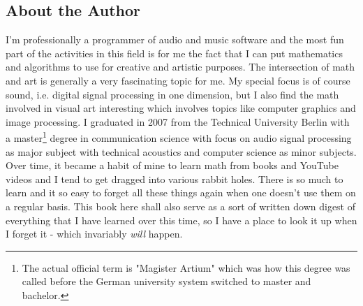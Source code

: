 

\subsection{About the Author}
I'm professionally a programmer of audio and music software and the most fun part of the activities in this field is for me the fact that I can put mathematics and algorithms to use for creative and artistic purposes. The intersection of math and art is generally a very fascinating topic for me. My special focus is of course sound, i.e. digital signal processing in one dimension, but I also find the math involved in visual art interesting which involves topics like computer graphics and image processing. I graduated in 2007 from the Technical University Berlin with a master\footnote{The actual official term is "Magister Artium" which was how this degree was called before the German university system switched to master and bachelor.} degree in communication science with focus on audio signal processing as major subject with technical acoustics and computer science as minor subjects. Over time, it became a habit of mine to learn math from books and YouTube videos and I tend to get dragged into various rabbit holes. There is so much to learn and it so easy to forget all these things again when one doesn't use them on a regular basis. This book here shall also serve as a sort of written down digest of everything that I have learned over this time, so I have a place to look it up when I forget it - which invariably \emph{will} happen.


